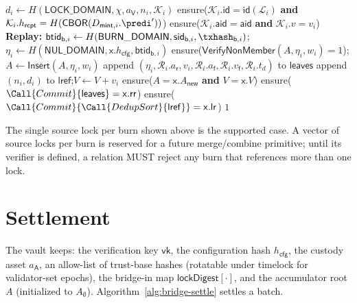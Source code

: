 \begin{algorithm}[!htbp]
\begin{algorithmic}[0]
    \State $d_i \gets H(\mathsf{LOCK\_DOMAIN},\chi,a_\mathsf{V},n_i,\mathcal{K}_i)$
    \State ensure($\mathcal{K}_i.\mathsf{id} = \mathsf{id}(\mathcal{L}_i)$ \textbf{and} $\mathcal{K}_i.h_\mathsf{rcpt} = H(\mathsf{CBOR}(D_{\mathsf{mint},i}.\predi'))$)
    \State ensure($\mathcal{K}_i.\mathsf{aid} = \mathsf{aid}$ \textbf{and} $\mathcal{K}_i.v = v_i$)
    \State \textbf{Replay:} $\mathsf{btid}_{\mathsf{b},i} \gets H(\mathsf{BURN\_DOMAIN},\mathsf{sid}_{\mathsf{b},i},\txhash_{\mathsf{b},i})$;\quad $\eta_i \gets H(\mathsf{NUL\_DOMAIN},\mathsf{x}.h_\mathsf{cfg},\mathsf{btid}_{\mathsf{b},i})$
    \State ensure($\mathsf{VerifyNonMember}(A,\eta_i,w_i) = 1$);\quad $A \gets \mathsf{Insert}(A,\eta_i,w_i)$
    \State append $(\eta_i, \mathcal{R}_i.a_\mathsf{r}, v_i, \mathcal{R}_i.a_\mathsf{f}, \mathcal{R}_i.v_\mathsf{f}, \mathcal{R}_i.t_d)$ to $\mathsf{leaves}$
    \State append $(n_i,d_i)$ to $\mathsf{lref}$;\quad $V \gets V + v_i$
  \EndFor
  \State ensure($A = \mathsf{x}.A_\mathsf{new}$ \textbf{and} $V = \mathsf{x}.V$)
  \State ensure($\Call{Commit}{\mathsf{leaves}} = \mathsf{x}.\mathsf{rr}$)
  \State ensure($\Call{Commit}{\Call{DedupSort}{\mathsf{lref}}} = \mathsf{x}.\mathsf{lr}$)
  \State \Return $1$
\EndFunction
\end{algorithmic}
\end{algorithm}

The single source lock per burn shown above is the supported case. A vector of source locks per burn is reserved for a future merge/combine primitive; until its verifier is defined, a relation MUST reject any burn that references more than one lock.

\section{Settlement}\label{app:bridging-settlement}

The vault keeps: the verification key $\mathsf{vk}$, the configuration hash $h_\mathsf{cfg}$, the custody asset $a_\mathsf{A}$, an allow-list of trust-base hashes (rotatable under timelock for validator-set epochs), the bridge-in map $\mathsf{lockDigest}[\cdot]$, and the accumulator root $A$ (initialized to $A_\emptyset$). Algorithm~\ref{alg:bridge-settle} settles a batch.

